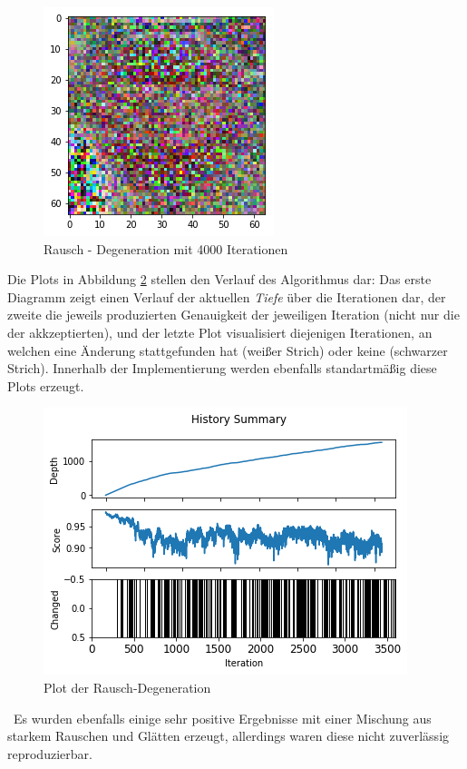\begin{figure}[h]
	\centering
	\includegraphics[width=0.4\linewidth]{Images/DegenSamples/StopTiefe4000}
	\caption[Degeneration Tiefe 4000]{Rausch - Degeneration mit 4000 Iterationen}
	\label{fig:stoptiefe4000}
\end{figure}

Die Plots in Abbildung \ref{fig:plotTiefe4000} stellen den Verlauf des Algorithmus dar: Das erste Diagramm zeigt einen Verlauf der aktuellen \textit{Tiefe} über die Iterationen dar, der zweite die jeweils produzierten Genauigkeit der jeweiligen Iteration (nicht nur die der akkzeptierten), und der letzte Plot visualisiert diejenigen Iterationen, an welchen eine Änderung stattgefunden hat (weißer Strich) oder keine (schwarzer Strich). Innerhalb der Implementierung werden ebenfalls standartmäßig diese Plots erzeugt.

\begin{figure}[h]
	\centering
	\includegraphics[width=0.6\linewidth]{Images/DegenSamples/StopTiefe4000Plot}
	\caption[Plot Degeneration]{Plot der Rausch-Degeneration}
	\label{fig:plotTiefe4000}
\end{figure}
~\newline Es wurden ebenfalls einige sehr positive Ergebnisse mit einer Mischung aus starkem Rauschen und Glätten erzeugt, allerdings waren diese nicht zuverlässig reproduzierbar. 

